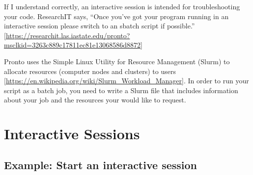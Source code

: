 \documentclass[
]{book}
\begin{document}
If I understand correctly, an interactive session is intended for troubleshooting your code. ResearchIT says, ``Once you've got your program running in an interactive session please switch to an sbatch script if possible.'' {[}\url{https://researchit.las.iastate.edu/pronto?msclkid=3263c889c17811ec81e13068586d8872}{]}

Pronto uses the Simple Linux Utility for Resource Management (Slurm) to allocate resources (computer nodes and clusters) to users {[}\url{https://en.wikipedia.org/wiki/Slurm_Workload_Manager}{]}. In order to run your script as a batch job, you need to write a Slurm file that includes information about your job and the resources your would like to request.

\hypertarget{interactive-sessions}{%
\section{Interactive Sessions}\label{interactive-sessions}}

\hypertarget{ex-start-interactive}{%
\subsection{Example: Start an interactive session}\label{ex-start-interactive}}
\end{document}
